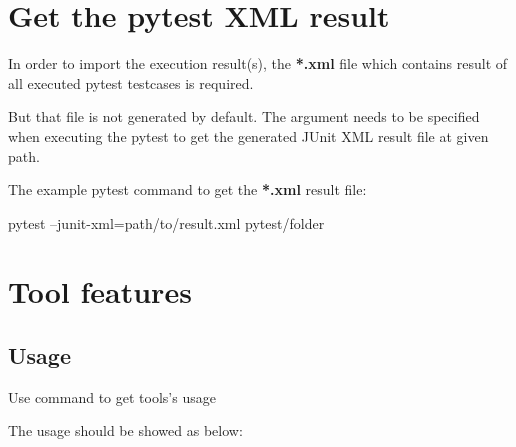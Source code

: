 



\hypertarget{get-the-pytest-xml-result}{%
\section{Get the pytest XML result}\label{get-the-pytest-xml-result}}

In order to import the execution result(s), the \textbf{*.xml} file
which contains result of all executed pytest testcases is required.

But that file is not generated by default. The argument
 needs to be specified when
executing the pytest to get the generated JUnit XML result file at given
path.

The example pytest command to get the \textbf{*.xml} result file:

\begin{robotlog}
pytest --junit-xml=path/to/result.xml pytest/folder
\end{robotlog}

\hypertarget{tool-features}{%
\section{Tool features}\label{tool-features}}

\hypertarget{usage}{%
\subsection{Usage}\label{usage}}

Use  command to get tools's usage

The usage should be showed as below:

